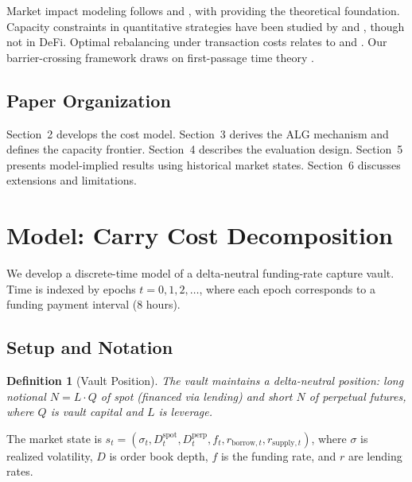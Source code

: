 \documentclass[11pt]{article}
\newtheorem{definition}{Definition}
\begin{document}
Market impact modeling follows \citet{almgren2005direct} and \citet{gatheral2010}, with \citet{kyle1985continuous} providing the theoretical foundation. Capacity constraints in quantitative strategies have been studied by \citet{vangelisti2006capacity} and \citet{korajczyk2004all}, though not in DeFi. Optimal rebalancing under transaction costs relates to \citet{davis1990portfolio} and \citet{leland1985option}. Our barrier-crossing framework draws on first-passage time theory \citep{karatzas1991brownian}.

\subsection{Paper Organization}

Section~2 develops the cost model. Section~3 derives the ALG mechanism and defines the capacity frontier. Section~4 describes the evaluation design. Section~5 presents model-implied results using historical market states. Section~6 discusses extensions and limitations.

\section{Model: Carry Cost Decomposition}

We develop a discrete-time model of a delta-neutral funding-rate capture vault. Time is indexed by epochs $t = 0, 1, 2, \ldots$, where each epoch corresponds to a funding payment interval (8 hours).

\subsection{Setup and Notation}

\begin{definition}[Vault Position]
The vault maintains a delta-neutral position: long notional $N = L \cdot Q$ of spot (financed via lending) and short $N$ of perpetual futures, where $Q$ is vault capital and $L$ is leverage.
\end{definition}

The market state is $s_t = (\sigma_t, D_t^{\text{spot}}, D_t^{\text{perp}}, f_t, r_{\text{borrow},t}, r_{\text{supply},t})$, where $\sigma$ is realized volatility, $D$ is order book depth, $f$ is the funding rate, and $r$ are lending rates.
\end{document}

